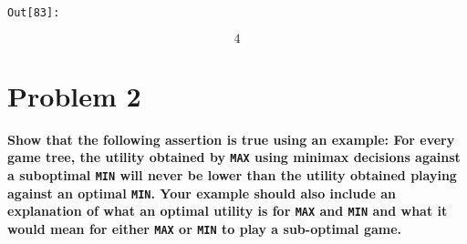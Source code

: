 \documentclass[11pt]{article}
\begin{document}
    \begin{center}
    \end{center}
    { \hspace*{\fill} \\}
    
    \begin{center}
    \end{center}
    { \hspace*{\fill} \\}
    
    \begin{center}
    \end{center}
    { \hspace*{\fill} \\}
    
    \begin{center}
    \end{center}
    { \hspace*{\fill} \\}
    
    \begin{center}
    \end{center}
    { \hspace*{\fill} \\}
    \texttt{\color{outcolor}Out[{\color{outcolor}83}]:}
    
    \[4\]

    

    \section{Problem 2}\label{problem-2}

\textbf{Show that the following assertion is true using an example: For
every game tree, the utility obtained by \texttt{MAX} using minimax
decisions against a suboptimal \texttt{MIN} will never be lower than the
utility obtained playing against an optimal \texttt{MIN}. Your example
should also include an explanation of what an optimal utility is for
\texttt{MAX} and \texttt{MIN} and what it would mean for either
\texttt{MAX} or \texttt{MIN} to play a sub-optimal game.}
\end{document}
